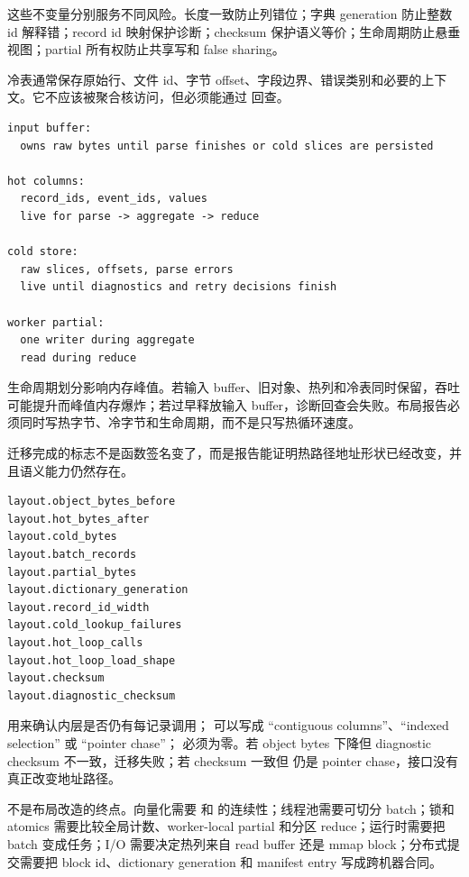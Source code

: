 这些不变量分别服务不同风险。长度一致防止列错位；字典 generation 防止整数 id 解释错；record id 映射保护诊断；checksum 保护语义等价；生命周期防止悬垂视图；partial 所有权防止共享写和 false sharing。

冷表通常保存原始行、文件 id、字节 offset、字段边界、错误类别和必要的上下文。它不应该被聚合核访问，但必须能通过  回查。

\begin{lstlisting}[numbers=none,caption={冷热路径的生命周期划分}]
input buffer:
  owns raw bytes until parse finishes or cold slices are persisted

hot columns:
  record_ids, event_ids, values
  live for parse -> aggregate -> reduce

cold store:
  raw slices, offsets, parse errors
  live until diagnostics and retry decisions finish

worker partial:
  one writer during aggregate
  read during reduce
\end{lstlisting}

生命周期划分影响内存峰值。若输入 buffer、旧对象、热列和冷表同时保留，吞吐可能提升而峰值内存爆炸；若过早释放输入 buffer，诊断回查会失败。布局报告必须同时写热字节、冷字节和生命周期，而不是只写热循环速度。

迁移完成的标志不是函数签名变了，而是报告能证明热路径地址形状已经改变，并且语义能力仍然存在。

\begin{lstlisting}[numbers=none,caption={布局迁移报告字段}]
layout.object_bytes_before
layout.hot_bytes_after
layout.cold_bytes
layout.batch_records
layout.partial_bytes
layout.dictionary_generation
layout.record_id_width
layout.cold_lookup_failures
layout.hot_loop_calls
layout.hot_loop_load_shape
layout.checksum
layout.diagnostic_checksum
\end{lstlisting}

 用来确认内层是否仍有每记录调用； 可以写成 ``contiguous columns''、``indexed selection'' 或 ``pointer chase''； 必须为零。若 object bytes 下降但 diagnostic checksum 不一致，迁移失败；若 checksum 一致但  仍是 pointer chase，接口没有真正改变地址路径。

 不是布局改造的终点。向量化需要  和  的连续性；线程池需要可切分 batch；锁和 atomics 需要比较全局计数、worker-local partial 和分区 reduce；运行时需要把 batch 变成任务；I/O 需要决定热列来自 read buffer 还是 mmap block；分布式提交需要把 block id、dictionary generation 和 manifest entry 写成跨机器合同。

